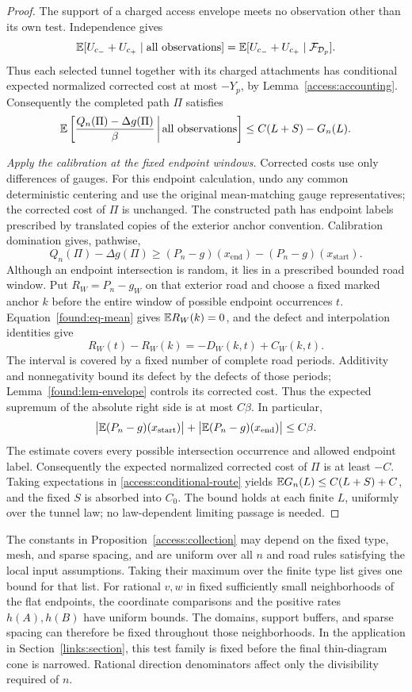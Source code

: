 \begin{proof}
The support of a charged access envelope meets no observation other
than its own test.  Independence gives
\[
 \mathbb E[U_{c_-}+U_{c_+}\mid\hbox{all observations}]
 =\mathbb E[U_{c_-}+U_{c_+}\mid\mathcal F_{\mathcal D_p}].
\]
Thus each selected tunnel together with its charged attachments has
conditional expected normalized corrected cost at most $-Y_p$, by
Lemma~\ref{access:accounting}.  Consequently the completed path $\Pi$
satisfies
\begin{equation}\label{access:conditional-route}
 \mathbb E\left[\frac{Q_n(\Pi)-\Delta g(\Pi)}{\beta}
           \,\middle|\,\hbox{all observations}\right]
                 \le C(L+S)-G_n(L).
\end{equation}

\emph{Apply the calibration at the fixed endpoint windows.}
Corrected costs use only differences of gauges. For this endpoint
calculation, undo any common deterministic centering and use the
original mean-matching gauge representatives; the corrected cost of
$\Pi$ is unchanged.
The constructed path has endpoint labels prescribed by translated copies
of the exterior anchor convention.  Calibration domination gives,
pathwise,
\[
 Q_n(\Pi)-\Delta g(\Pi)
 \ge (P_n-g)(x_{\mathrm{end}})-(P_n-g)(x_{\mathrm{start}}).
\]
Although an endpoint intersection is random, it lies in a prescribed
bounded road window.  Put $R_W=P_n-g_W$ on that exterior road and choose
a fixed marked anchor $k$ before the entire window of possible endpoint
occurrences $t$.  Equation~\eqref{found:eq-mean} gives
$\mathbb E R_W(k)=0$, and the defect and interpolation identities give
\[
 R_W(t)-R_W(k)=-D_W(k,t)+C_W(k,t).
\]
The interval is covered by a fixed number of complete road periods.
Additivity and nonnegativity bound its defect by the defects of those
periods; Lemma~\ref{found:lem-envelope} controls its corrected cost.
Thus the expected supremum of the absolute right side is at most
$C\beta$.  In particular,
\[
 \bigl|\mathbb E(P_n-g)(x_{\mathrm{start}})\bigr|
 +\bigl|\mathbb E(P_n-g)(x_{\mathrm{end}})\bigr|
 \le C\beta.
\]
The estimate covers every possible intersection occurrence and allowed
endpoint label.  Consequently the expected normalized corrected cost of
$\Pi$ is at least $-C$.  Taking expectations in
\eqref{access:conditional-route} yields
$\mathbb E G_n(L)\le C(L+S)+C$, and the fixed $S$ is absorbed into $C_0$.
The bound holds at each finite $L$, uniformly over the tunnel law; no
law-dependent limiting passage is needed.
\end{proof}

The constants in Proposition~\ref{access:collection} may depend on the
fixed type, mesh, and sparse spacing, and are uniform over all $n$ and
road rules satisfying the local input assumptions.  Taking their maximum
over the finite type list gives one bound for that list.  For rational
$v,w$ in fixed sufficiently small neighborhoods of the flat endpoints,
the coordinate comparisons and the positive rates $h(A),h(B)$ have
uniform bounds.  The domains, support buffers, and sparse spacing can
therefore be fixed throughout those neighborhoods.  In the application
in Section~\ref{links:section}, this test family is fixed before the
final thin-diagram cone is narrowed.  Rational direction denominators
affect only the divisibility required of $n$.

